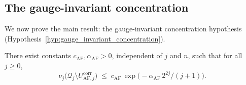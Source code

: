 \subsection{The gauge-invariant concentration}
\label{ssec:app231_concentration}

We now prove the main result: the gauge-invariant concentration
hypothesis (Hypothesis~\ref{hyp:gauge_invariant_concentration}).

\begin{theorem}
\label{thm:concentration_main}
There exist constants $c_{\mathrm{AF}},\alpha_{\mathrm{AF}}>0$,
independent of $j$ and $n$, such that for all $j\ge 0$,
\begin{equation}
\label{eq:concentration_main}
  \nu_{j}\bigl(\mathcal{Q}_{j}\setminus U_{\mathrm{AF},j}^{\mathrm{
  corr}}\bigr)
  \;\le\;c_{\mathrm{AF}}\,\exp\!\bigl(-\alpha_{\mathrm{AF}}\,
  2^{2j}/(j+1)\bigr).
\end{equation}
\end{theorem}

